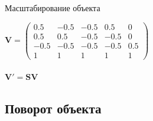 \documentclass[10pt]{beamer}
\begin{document}
	\begin{frame}{Масштабирование объекта}
		{
		}
		{
			$\mathbf V = 
			\begin{pmatrix}
				0.5 & -0.5 &-0.5& 0.5& 0\\
				0.5 & 0.5& -0.5& -0.5 & 0\\
				-0.5& -0.5& -0.5 &-0.5& 0.5\\
				1& 1& 1& 1& 1
			\end{pmatrix}$ \\ ~ \\
			
			$\mathbf V' = \mathbf{SV}$
			
			
		}
	\end{frame}

	
	\subsection{Поворот объекта}	
	
\end{document}
